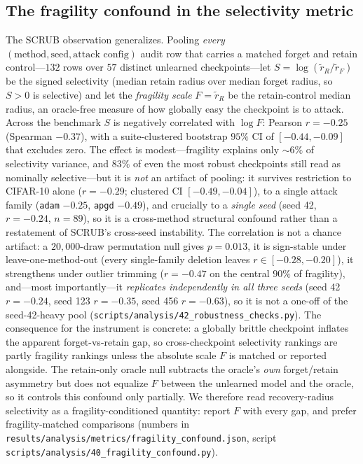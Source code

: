 \documentclass[11pt]{article}
\begin{document}
\subsection{The fragility confound in the selectivity metric}
\label{sec:confound}
The SCRUB observation generalizes. Pooling \emph{every} $(\text{method},\text{seed},\text{attack config})$ audit row that carries a matched forget and retain control---$132$ rows over $57$ distinct unlearned checkpoints---let $S = \log(\tilde r_R / \tilde r_F)$ be the signed selectivity (median retain radius over median forget radius, so $S>0$ is selective) and let the \emph{fragility scale} $F = \tilde r_R$ be the retain-control median radius, an oracle-free measure of how globally easy the checkpoint is to attack. Across the benchmark $S$ is negatively correlated with $\log F$: Pearson $r = -0.25$ (Spearman $-0.37$), with a suite-clustered bootstrap $95\%$ CI of $[-0.44,-0.09]$ that excludes zero. The effect is modest---fragility explains only $\sim\!6\%$ of selectivity variance, and $83\%$ of even the most robust checkpoints still read as nominally selective---but it is \emph{not} an artifact of pooling: it survives restriction to CIFAR-10 alone ($r=-0.29$; clustered CI $[-0.49,-0.04]$), to a single attack family (\texttt{adam} $-0.25$, \texttt{apgd} $-0.49$), and crucially to a \emph{single seed} (seed 42, $r=-0.24$, $n=89$), so it is a cross-method structural confound rather than a restatement of SCRUB's cross-seed instability. The correlation is not a chance artifact: a $20{,}000$-draw permutation null gives $p = 0.013$, it is sign-stable under leave-one-method-out (every single-family deletion leaves $r \in [-0.28,-0.20]$), it strengthens under outlier trimming ($r=-0.47$ on the central $90\%$ of fragility), and---most importantly---it \emph{replicates independently in all three seeds} (seed 42 $r=-0.24$, seed 123 $r=-0.35$, seed 456 $r=-0.63$), so it is not a one-off of the seed-42-heavy pool (\texttt{scripts/analysis/42\_robustness\_checks.py}). The consequence for the instrument is concrete: a globally brittle checkpoint inflates the apparent forget-vs-retain gap, so cross-checkpoint selectivity rankings are partly fragility rankings unless the absolute scale $F$ is matched or reported alongside. The retain-only oracle null subtracts the oracle's \emph{own} forget/retain asymmetry but does not equalize $F$ between the unlearned model and the oracle, so it controls this confound only partially. We therefore read recovery-radius selectivity as a fragility-conditioned quantity: report $F$ with every gap, and prefer fragility-matched comparisons (numbers in \texttt{results/analysis/metrics/fragility\_confound.json}, script \texttt{scripts/analysis/40\_fragility\_confound.py}).
\end{document}
